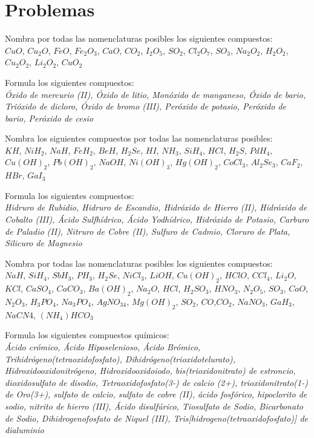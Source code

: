 \section{Problemas}
\begin{problem}
	Nombra por todas las nomenclaturas posibles los siguientes compuestos: \\ $CuO$, $Cu_2O$, $FeO$, $Fe_2O_3$, $CaO$, $CO_2$, $I_2O_5$, $SO_2$, $Cl_2O_7$, $SO_3$, $Na_2O_2$, $H_2O_2$, $Cu_2O_2$, $Li_2O_2$, $CuO_2$ \\
\end{problem}
\begin{problem}
	Formula los siguientes compuestos:\\ \textit{Óxido de mercurio (II), Óxido de litio, Monóxido de manganeso, Óxido de bario, Trióxido de dicloro, Óxido de bromo (III), Peróxido de potasio, Peróxido de bario, Peróxido de cesio}\\
\end{problem}
\begin{problem}
	Nombra los siguientes compuestos por todas las nomenclaturas posibles:\\ $KH$, $NiH_2$, $NaH$, $FeH_2$, $BeH$, $H_2Se$, $HI$, $NH_3$, $SiH_4$, $HCl$, $H_2S$, $PdH_4$, $Cu(OH)_2$, $Pb(OH)_2$, $NaOH$, $Ni(OH)_3$, $Hg(OH)_2$, $CoCl_3$, $Al_2Se_3$, $CaF_2$, $HBr$, $GaI_3$ \\
\end{problem}
\begin{problem}
	Formula los siguientes compuestos:\\ \textit{Hidruro de Rubidio, Hidruro de Escandio, Hidróxido de Hierro (II), Hidróxido de Cobalto (III), Ácido Sulfhídrico, Ácido Yodhídrico, Hidróxido de Potasio, Carburo de Paladio (II), Nitruro de Cobre (II), Sulfuro de Cadmio, Cloruro de Plata, Silicuro de Magnesio}\\
\end{problem}
\begin{problem}
	Nombra por todas las nomenclaturas posibles los siguientes compuestos:\\ $NaH$, $SiH_4$, $SbH_3$, $PH_3$, $H_2Se$, $NiCl_3$, $LiOH$, $Cu(OH)_2$, $HClO$, $CCl_4$, $Li_2O$, $KCl$, $CaSO_4$, $CaCO_3$, $Ba(OH)_2$, $Na_2O$, $HCl$, $H_2SO_3$, $HNO_3$, $N_2O_5$, $SO_3$, $CaO$, $N_2O_3$, $H_3PO_4$, $Na_3PO_4$, $AgNO_34$, $Mg(OH)_2$, $SO_2$, $CO$,$CO_2$, $NaNO_3$, $GaH_3$, $NaCN4$, $(NH_4)HCO_3$\\
\end{problem}
\begin{problem}
	Formula los siguientes compuestos químicos:\\ \textit{Ácido crómico, Ácido Hiposelenioso, Ácido Brómico, Trihidrógeno(tetraoxidofosfato), Dihidrógeno(trioxidotelurato),  Hidroxidooxidonitrógeno, Hidroxidooxidoiodo, bis(trioxidonitrato) de estroncio, dioxidosulfato de disodio, Tetraoxidofosfato(3-) de calcio (2+), trioxidonitrato(1-) de Oro(3+), sulfato de calcio, sulfato de cobre (II), ácido fosfórico, hipoclorito de sodio, nitrito de hierro (III), Ácido disulfúrico, Tiosulfato de Sodio, Bicarbonato de Sodio, Dihidrogenofosfato de Niquel (III), Tris[hidrogeno(tetraoxidofosfato)] de dialuminio}\\
\end{problem}
